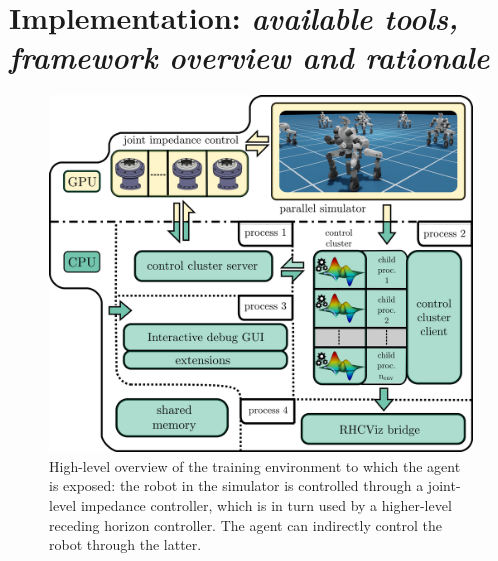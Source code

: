 \section{Implementation: \textnormal{\textit{available tools, framework overview and rationale}}}
\begin{figure}[t]
	\centering
	\includegraphics[width=1.0\columnwidth]{imgs/cocluster_arch.pdf}
	\caption{High-level overview of the training environment to which the agent is exposed: the robot in the simulator is controlled through a joint-level impedance controller, which is in turn used by a higher-level receding horizon controller. The agent can indirectly control the robot through the latter.}
	\label{fig:coclbridge_arch}
\end{figure}
\cite{mystuff::lrhccontrol}
\cite{mystuff::omnirobogym}
\cite{mystuff::coclusterbridge}
\cite{mystuff::rhcviz}
\cite{mystuff::sharsoripcpp}